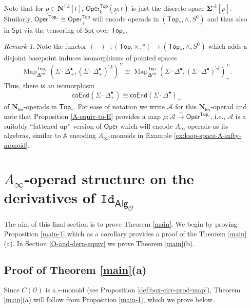 \documentclass[11pt]{amsart}
\theoremstyle{definition}
\theoremstyle{remark}
\newtheorem{remark}[subsection]{Remark}
\newcommand{\Top}{\mathsf{Top}_*}
\newcommand{\Spt}{\mathsf{Spt}}
\newcommand{\Alg}[1]{ {\mathsf{Alg}_{\mathcal{#1}}} }
\newcommand{\Oper}{\mathsf{Oper}}
\newcommand{\Map}{\operatorname{Map}}
\newcommand{\Id}{\mathtt{Id}}
\newcommand{\pt}{*}
\newcommand{\Cal}[1]{\mathcal{#1}}
\newcommand{\Ncirc}[1]{\mathbf{N}^{\hat{\circ}#1}}
\newcommand{\boxcirc}{\mathring{\square}}
\newcommand{\Nl}{\mathbf{N}_{\mathsf{lev}}}
\newcommand{\SD}{\Sigma{\cdot}\Delta^{\bullet}}
\newcommand{\bdel}{\mathbf{\Delta}}
\newcommand{\Dres}{\bdel^{\mathsf{res}}}
\begin{document}
Note that for $\underline{p}\in \Ncirc{k}[t]$, $\Oper^{\mathsf{Top}}_{k}(\underline{p};t)$ is just the discrete space $\mathbf{\Sigma}^{\circ k}[\underline{p}]$. Similarly, $\Oper^{\Top}\cong \Oper^{\mathsf{Top}}_+$ will encode operads in $(\Top, \wedge, S^0)$ and thus also in $\Spt$ via the tensoring of $\Spt$ over $\Top$. 

\begin{remark} \label{rem:rho}Note the functor $(-)_+ \colon (\mathsf{Top}, \times, \pt) \to (\Top, \wedge, S^0)$ which adds a disjoint basepoint induces isomorphisms of pointed spaces \[ \Map_{\Dres}^{\Top}  \left( \SD_+, (\SD_+)^{\boxcirc k} \right)^{\Sigma}\cong \Map_{\Dres}^{\mathsf{Top}} \left( \SD, (\SD)^{\boxcirc k} \right)^{\Sigma}_+. \]
Thus, there is an isomorphism \[\mathsf{coEnd}(\SD_+)\cong \mathsf{coEnd}(\SD)_+\] of $\Nl$-operads in $\Top$. For ease of notation we write $\Cal{A}$ for this $\Nl$-operad and note that Proposition \ref{A-equiv-to-E} provides a map $\rho\colon \Cal{A}\xrightarrow{\sim} \Oper^{\Top}$, i.e., $\Cal{A}$ is a suitably ``fattened-up'' version of $\Oper$ which will encode $A_{\infty}$-operads as its algebras, similar to $\mathbb{A}$ encoding $A_{\infty}$-monoids in Example \ref{ex:loop-space-A-infty-monoid}. 
\end{remark}

\section{$A_{\infty}$-operad structure on the derivatives of $\Id_{\Alg{O}}$}
\label{proofs}

The aim of this final section is to prove Theorem \ref{main}. We begin by proving Proposition \ref{main-1} which as a corollary provides a proof of the Theorem \ref{main}(a). In Section \ref{O-and-dern-equiv} we prove Theorem \ref{main}(b).

\subsection{Proof of Theorem \ref{main}(a)} \label{sec:1a} Since $C(\Cal{O})$ is a $\boxcirc$-monoid (see Proposition \ref{def:box-circ-prod-map}), Theorem \ref{main}(a) will follow from Proposition \ref{main-1}, which we prove below. 
\end{document}
